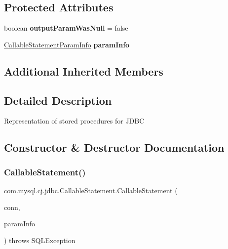 \subsection*{Protected Attributes}
\begin{DoxyCompactItemize}
\item 
\mbox{\label{classcom_1_1mysql_1_1cj_1_1jdbc_1_1_callable_statement_a50b0a5e60e29ab7d67b07a27004293c4}} 
boolean {\bfseries output\+Param\+Was\+Null} = false
\item 
\mbox{\label{classcom_1_1mysql_1_1cj_1_1jdbc_1_1_callable_statement_a9b918f6fd2f0ff28fc6b3c8560d9a59b}} 
\mbox{\hyperlink{classcom_1_1mysql_1_1cj_1_1jdbc_1_1_callable_statement_1_1_callable_statement_param_info}{Callable\+Statement\+Param\+Info}} {\bfseries param\+Info}
\end{DoxyCompactItemize}
\subsection*{Additional Inherited Members}


\subsection{Detailed Description}
Representation of stored procedures for J\+D\+BC 

\subsection{Constructor \& Destructor Documentation}
\mbox{\label{classcom_1_1mysql_1_1cj_1_1jdbc_1_1_callable_statement_aedac79a513af12d5af9a38c06593ae77}} 
\subsubsection{\texorpdfstring{Callable\+Statement()}{CallableStatement()}\hspace{0.1cm}{\footnotesize\ttfamily [1/2]}}
{\footnotesize\ttfamily com.\+mysql.\+cj.\+jdbc.\+Callable\+Statement.\+Callable\+Statement (\begin{DoxyParamCaption}\item[{\mbox{\hyperlink{interfacecom_1_1mysql_1_1cj_1_1jdbc_1_1_jdbc_connection}{Jdbc\+Connection}}}]{conn,  }\item[{\mbox{\hyperlink{classcom_1_1mysql_1_1cj_1_1jdbc_1_1_callable_statement_1_1_callable_statement_param_info}{Callable\+Statement\+Param\+Info}}}]{param\+Info }\end{DoxyParamCaption}) throws S\+Q\+L\+Exception}

